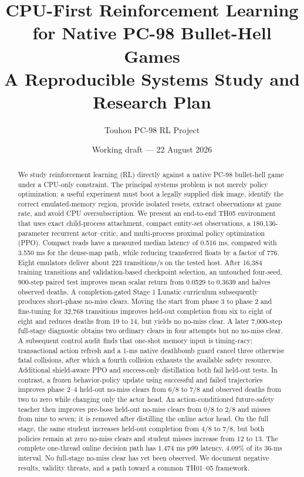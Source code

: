 \documentclass[10pt]{article}
\title{CPU-First Reinforcement Learning for Native PC-98 Bullet-Hell Games\\
\large A Reproducible Systems Study and Research Plan}
\author{Touhou PC-98 RL Project}
\date{Working draft --- 22 August 2026}
\begin{document}
\maketitle

\begin{abstract}
We study reinforcement learning (RL) directly against a native PC-98 bullet-hell
game under a CPU-only constraint.  The principal systems problem is not merely
policy optimization: a useful experiment must boot a legally supplied disk
image, identify the correct emulated-memory region, provide isolated resets,
extract observations at game rate, and avoid CPU oversubscription.  We present
an end-to-end TH05 environment that uses exact child-process attachment, compact
entity-set observations, a 180,136-parameter recurrent actor--critic, and
multi-process proximal policy optimization (PPO).  Compact reads have a measured
median latency of 0.516 ms, compared with 3.550 ms for the dense-map path, while
reducing transferred floats by a factor of 776.  Eight emulators deliver about
223 transitions/s on the tested host.  After 16,384 training transitions and
validation-based checkpoint selection, an untouched four-seed, 900-step paired
test improves mean scalar return from 0.0529 to 0.3639 and halves observed
deaths.  A completion-gated Stage 1 Lunatic curriculum subsequently produces
short-phase no-miss clears.  Moving the start from phase 3 to phase 2 and
fine-tuning for 32,768 transitions improves held-out completion from six to
eight of eight and reduces deaths from 19 to 14, but yields no no-miss clear.
A later 7,000-step full-stage diagnostic obtains two ordinary clears in four
attempts but no no-miss clear.  A subsequent control audit finds that one-shot
memory input is timing-racy; transactional action refresh and a 1-ms native
deathbomb guard cancel three otherwise fatal collisions, after which a fourth
collision exhausts the available safety resource.  Additional shield-aware PPO
and success-only distillation both fail held-out tests.  In contrast, a frozen
behavior-policy update using successful and failed trajectories improves phase
2--4 held-out no-miss clears from 6/8 to 7/8 and observed deaths from two to
zero while changing only the actor head.  An action-conditioned future-safety
teacher then improves pre-boss held-out no-miss clears from 0/8 to 2/8 and
misses from nine to seven; it is removed after distilling the online actor
head.  On the full stage, the same student increases held-out completion from
4/8 to 7/8, but both policies remain at zero no-miss clears and student misses
increase from 12 to 13.  The complete one-thread online decision path has
1.474 ms p99 latency, 4.09\% of its 36-ms interval.  No full-stage no-miss
clear has yet been observed.  We document negative results, validity threats,
and a path toward a common TH01--05 framework.
\end{abstract}
\end{document}
